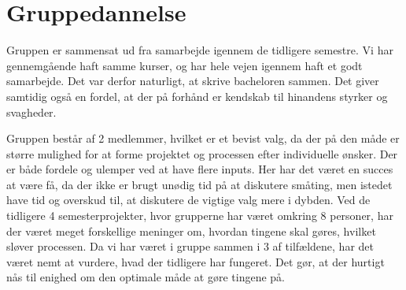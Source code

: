 \chapter{Gruppedannelse}
Gruppen er sammensat ud fra samarbejde igennem de tidligere semestre. Vi har gennemgående haft samme kurser, og har hele vejen igennem haft et godt samarbejde. Det var derfor naturligt, at skrive bacheloren sammen. Det giver samtidig også en fordel, at der på forhånd er kendskab til hinandens styrker og svagheder.


Gruppen består af 2 medlemmer, hvilket er et bevist valg, da der på den måde er større mulighed for at forme projektet og processen efter individuelle ønsker. Der er både fordele og ulemper ved at have flere inputs. Her har det været en succes at være få, da der ikke er brugt unødig tid på at diskutere småting, men istedet have tid og overskud til, at diskutere de vigtige valg mere i dybden. Ved de tidligere 4 semesterprojekter, hvor grupperne har været omkring 8 personer, har der været meget forskellige meninger om, hvordan tingene skal gøres, hvilket sløver processen. Da vi har været i gruppe sammen i 3 af tilfældene, har det været nemt at vurdere, hvad der tidligere har fungeret. Det gør, at der hurtigt nås til enighed om den optimale måde at gøre tingene på.
